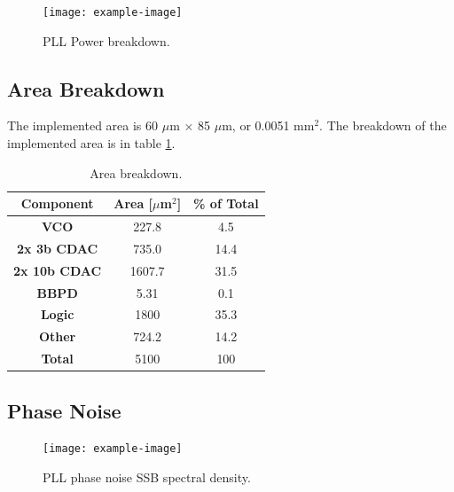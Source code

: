 		\begin{figure}[htb!]
	        \centering
	        \texttt{[image: example-image]}
		    \caption{PLL Power breakdown.}
		    \label{fig:pow_bkdn}
		\end{figure}

\subsection{Area Breakdown}
The implemented area is 60 $\mu$m $\times$ 85 $\mu$m, or 0.0051 mm$^2$. The breakdown of the implemented area is in table \ref{tab:area_bkdn}.

		\begin{table}[htb!]
			\centering
			\def\arraystretch{1.5}		
			\setlength\arrayrulewidth{0.75pt}
			\setlength{\tabcolsep}{1em} %
			\begin{tabular}{|c|c|c|}
				\hline 
				\rule[-1ex]{0pt}{2.5ex} \cellcolor{gray!40}\textbf{Component} & \cellcolor{gray!40}\textbf{Area [$\mu$m$^2$]} & \cellcolor{gray!40}\textbf{\% of Total}\\ 
				\hline 
				\rule[-1ex]{0pt}{2.5ex} \textbf{VCO} &  227.8 & 4.5  \\ 
				\hline 
				\rule[-1ex]{0pt}{2.5ex} \textbf{2x 3b CDAC} &  735.0 &  14.4  \\ 
				\hline 
				\rule[-1ex]{0pt}{2.5ex} \textbf{2x 10b CDAC} &  1607.7 &  31.5  \\ 
				\hline 
				\rule[-1ex]{0pt}{2.5ex} \textbf{BBPD} &  5.31 &  0.1  \\ 
				\hline 
				\rule[-1ex]{0pt}{2.5ex} \textbf{Logic} &  1800 &  35.3  \\ 
				\hline 
				\rule[-1ex]{0pt}{2.5ex} \textbf{Other} &  724.2 &  14.2  \\ 
				\hline 
				\rule[-1ex]{0pt}{2.5ex} \textbf{Total} &  5100 &  100  \\ 
				\hline 
			\end{tabular} 
			\caption{Area breakdown.}
			\label{tab:area_bkdn}
		\end{table}   


\subsection{Phase Noise}
		\begin{figure}[htb!]
	        \centering
	        \texttt{[image: example-image]}
		    \caption{PLL phase noise SSB spectral density.}
		    \label{fig:sim_pll_psd}
		\end{figure}

